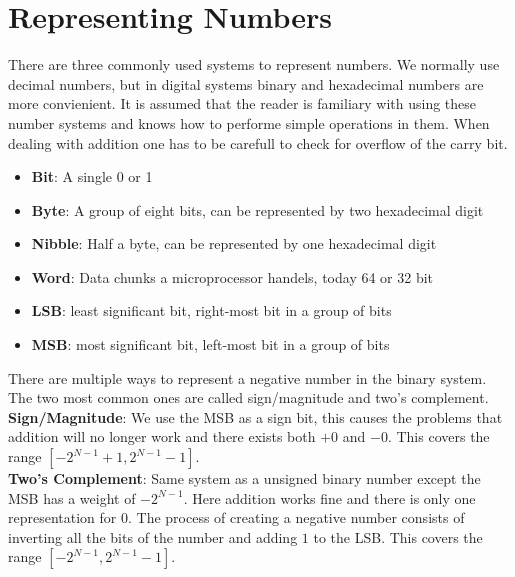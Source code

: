 \documentclass[a4paper]{report}
\begin{document}
\pagebreak

\section{Representing Numbers}

There are three commonly used systems to represent numbers. We normally use decimal numbers, but
in digital systems binary and hexadecimal numbers are more convienient. It is assumed that the reader
is familiary with using these number systems and knows how to performe simple operations in them. When
dealing with addition one has to be carefull to check for overflow of the carry bit.

\begin{satz}
    \begin{itemize}
        \item \textbf{Bit}: A single 0 or 1
        \item \textbf{Byte}: A group of eight bits, can be represented by two hexadecimal digit
        \item \textbf{Nibble}: Half a byte, can be represented by one hexadecimal digit
        \item \textbf{Word}: Data chunks a microprocessor handels, today 64 or 32 bit
        \item \textbf{LSB}: least significant bit, right-most bit in a group of bits
        \item \textbf{MSB}: most significant bit, left-most bit in a group of bits
    \end{itemize}
\end{satz}

There are multiple ways to represent a negative number in the binary system. The two most common ones are
called sign/magnitude and two's complement. \\

\textbf{Sign/Magnitude}: We use the MSB as a sign bit, this causes the problems that addition will no longer work
and there exists both $+0$ and $-0$. This covers the range $[-2^{N-1}+1, 2^{N-1}-1]$. \\

\textbf{Two's Complement}: Same system as a unsigned binary number except the MSB has a weight of $-2^{N-1}$.
Here addition works fine and there is only one representation for $0$. The process of creating a negative number
consists of inverting all the bits of the number and adding $1$ to the LSB. This covers the range $[-2^{N-1}, 2^{N-1}-1]$.
\end{document}
